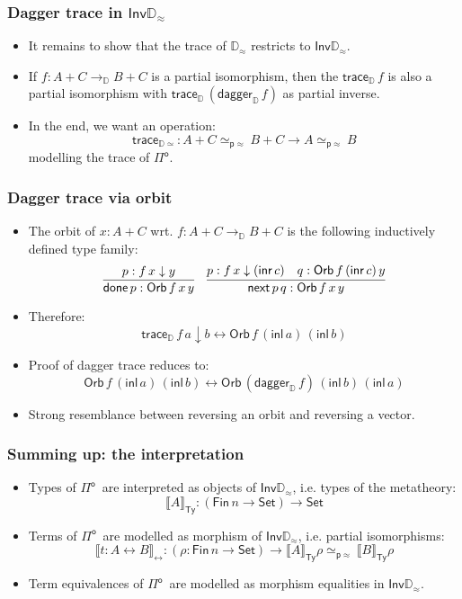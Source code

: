 \documentclass[12pt,t]{beamer}
\newcommand{\red}[1]{\textcolor{red}{#1}}
\newcommand{\Pio}{\ensuremath{\mathsf{\Pi}^{\mathsf{o}}}}
\newcommand{\Set}{\mathsf{Set}}
\newcommand{\inl}{\mathsf{inl}}
\newcommand{\inr}{\mathsf{inr}}
\newcommand{\Inv}{\mathsf{Inv}}
\newcommand{\lr}{\longleftrightarrow}
\newcommand{\LR}{\iff}
\newcommand{\dn}{\downarrow}
\newcommand{\D}{\mathbb{D}}
\newcommand{\Dapprox}{\mathbb{D}_{\approx}}
\newcommand{\traceD}{\mathsf{trace}_\D}
\newcommand{\daggerD}{\mathsf{dagger}_\D}
\newcommand{\Orb}[3]{\mathsf{Orb}\,#1\,#2\,#3}
\newcommand{\done}{\mathsf{done}}
\newcommand{\mynext}{\mathsf{next}}
\newcommand{\semTy}[1]{{\llbracket #1 \rrbracket}_\mathsf{Ty}}
\newcommand{\semTm}[1]{{\llbracket #1 \rrbracket}_{\lr}}
\newcommand{\semEq}[1]{{\llbracket #1 \rrbracket}_{\!\!\LR}}
\newcommand{\semTrace}{\mathsf{trace}_{\D\simeq}}
\begin{document}
\begin{frame}
  \frametitle{Dagger trace in $\Inv\Dapprox$}
  \begin{itemize}
  \item It remains to show that the trace of $\Dapprox$ restricts to
    $\Inv\Dapprox$.
  \item If $f : A + C \to_\D B + C$ is a partial isomorphism, then the
    $\traceD\,f$ is also a partial isomorphism with
    $\traceD\,(\daggerD\,f)$ as partial inverse.
  \item In the end, we want an operation:
    \[
    \semTrace : A + C\simeq_{\mathsf{p}\approx} B + C \to A \simeq_{\mathsf{p}\approx} B
    \]
    modelling the trace of \Pio.
   
  \end{itemize}
\end{frame}

\begin{frame}
  \frametitle{Dagger trace via orbit}
  \begin{itemize}
  \item The orbit of $x : A + C$ wrt. $f : A + C \to_{\D} B + C$
    is the following inductively defined type family:
    \[
    \infer{\done\,p : \Orb f x y}{p : f \,x \dn y} \quad
    \infer{\mynext\,p \,q : \Orb f x y}{p : f \,x \dn (\inr\,c) & q :
      \Orb f {(\inr\,c)} y}
    \]
  \item Therefore: %
    \[
    \traceD\,f\,a \dn b \leftrightarrow \Orb f{(\inl\,a)} {(\inl\,b)}
    \]
  \item Proof of dagger trace reduces to: 
    \[
    \Orb f {(\inl\,a)} {(\inl\,b)} \leftrightarrow \Orb
         {(\daggerD\,f)} {(\inl\,b)} {(\inl\,a)}
    \]
    \vspace{\fill}
  \item Strong resemblance between reversing an orbit and
    reversing a vector.
  \end{itemize}
\end{frame}

\begin{frame}
  \frametitle{Summing up: the interpretation}
  \begin{itemize}
  \item Types of \Pio\ are interpreted as objects of $\Inv\Dapprox$, i.e. types
    of the metatheory:
    \[
    \semTy A : (\mathsf{Fin}\,n \to \Set) \to \Set
    \]
  \item Terms of \Pio\ are modelled as morphism of $\Inv\Dapprox$,
i.e. partial isomorphisms:
    \[
    \semTm {t : A \lr B} : (\rho : \mathsf{Fin}\,n \to \Set) \to \semTy A \rho \simeq_{\mathsf{p}\approx} \semTy B \rho
    \]
  \item Term equivalences of \Pio\ are modelled as morphism equalities
    in $\Inv\Dapprox$.
  \end{itemize}
  
\end{frame}
\end{document}
